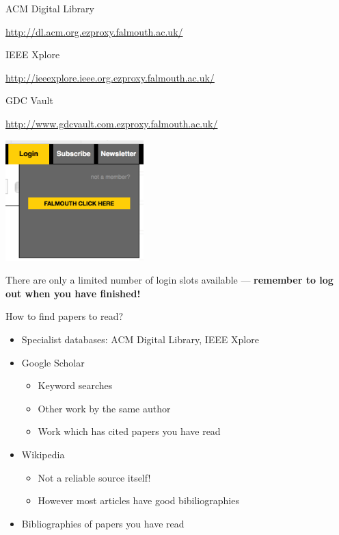 \begin{frame}{ACM Digital Library}
	\begin{center}
		\small\url{http://dl.acm.org.ezproxy.falmouth.ac.uk/}
	\end{center}
\end{frame}

\begin{frame}{IEEE Xplore}
	\begin{center}
		\small\url{http://ieeexplore.ieee.org.ezproxy.falmouth.ac.uk/}
	\end{center}
\end{frame}

\begin{frame}{GDC Vault}
	\begin{center}
		\small\url{http://www.gdcvault.com.ezproxy.falmouth.ac.uk/}
		
		\vspace{2ex}
		
		\includegraphics[width=0.4\textwidth]{gdc_login}

		\vspace{2ex}

        There are only a limited number of login slots available --- \textbf{remember to log out when you have finished!}
	\end{center}
\end{frame}

\begin{frame}{How to find papers to read?}
	\begin{itemize}
		\pause\item Specialist databases: ACM Digital Library, IEEE Xplore
		\pause\item Google Scholar
		    \begin{itemize}
		        \pause\item Keyword searches
		        \pause\item Other work by the same author
		        \pause\item Work which has cited papers you have read
		    \end{itemize}
		\pause\item Wikipedia
		    \begin{itemize}
		        \pause\item Not a reliable source itself!
		        \pause\item However most articles have good bibiliographies
		    \end{itemize}
		\pause\item Bibliographies of papers you have read
	\end{itemize}
\end{frame}

